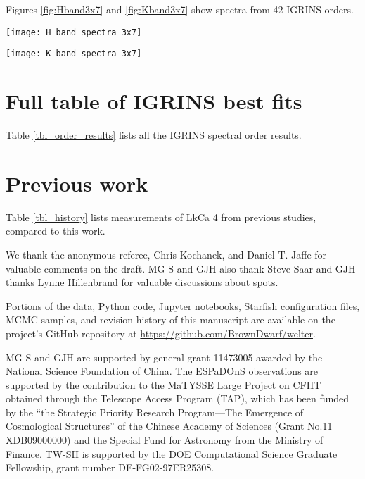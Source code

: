 \documentclass[twocolumn]{emulateapj}%
\newcommand{\name}{LkCa 4 }
\begin{document}
Figures \ref{fig:Hband3x7} and \ref{fig:Kband3x7} show spectra from 42 IGRINS orders.


\begin{figure*}
 \centering
 \texttt{[image: H\_band\_spectra\_3x7]}
 \caption{IGRINS Orders $122-100$, with panels arranged with the shortest wavelength in the upper left corner with central wavelength decreasing toward the bottom of the leftmost column, then decreasing through the subsequent columns.  The $y-$axis is on a logarithmic scale.  The red line is the cool photosphere while the blue line is the hot photosphere.  The purple line is the composite mixture model.}
 \label{fig:Hband3x7}
\end{figure*}

\begin{figure*}
 \centering
 \texttt{[image: K\_band\_spectra\_3x7]}
 \caption{IGRINS Orders $93-73$, with the same layout, ordering, and colors as Figure \ref{fig:Hband3x7}. The $y-$axis is on a logarithmic scale.}
 \label{fig:Kband3x7}
\end{figure*}



\section{Full table of IGRINS best fits}

Table \ref{tbl_order_results} lists all the IGRINS spectral order results.
\LongTables


\section{Previous work}

Table \ref{tbl_history} lists measurements of \name from previous studies, compared to this work.



\acknowledgements

We thank the anonymous referee, Chris Kochanek, and Daniel T. Jaffe for valuable comments on the draft.  MG-S and GJH also thank Steve Saar and GJH thanks Lynne Hillenbrand for valuable discussions about spots.

Portions of the data, Python code, Jupyter notebooks, Starfish configuration files, MCMC samples, and revision history of this manuscript are available on the project's GitHub repository at \url{https://github.com/BrownDwarf/welter}.

MG-S and GJH are supported by general grant 11473005 awarded by the National Science Foundation of China.   The ESPaDOnS observations are supported by the contribution to the MaTYSSE Large Project on CFHT obtained through the Telescope Access Program (TAP), which has been funded by the ``the Strategic Priority Research Program---The Emergence of Cosmological Structures'' of the Chinese Academy of Sciences (Grant No.11 XDB09000000) and the Special Fund for Astronomy from the Ministry of Finance. 
TW-SH is supported by the DOE Computational Science Graduate Fellowship, grant number DE-FG02-97ER25308.
\end{document}
